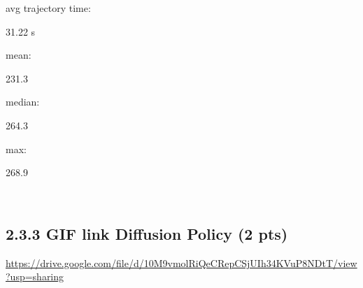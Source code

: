 \documentclass[12pt]{article}
\begin{document}
avg trajectory time: \begin{tcolorbox}[fit,height=1cm, width=2cm, blank, borderline={1pt}{1pt},nobeforeafter]
    \begin{center}
    \vspace{3mm}
    \large{31.22 s}
    \end{center}
\end{tcolorbox}
mean: \begin{tcolorbox}[fit,height=1cm, width=2cm, blank, borderline={1pt}{1pt},nobeforeafter]
    \begin{center}
    \vspace{3mm}
    \large{231.3}
    \end{center}
\end{tcolorbox}
median: \begin{tcolorbox}[fit,height=1cm, width=2cm, blank, borderline={1pt}{1pt},nobeforeafter]
    \begin{center}
    \vspace{3mm}
    \large{264.3}
    \end{center}
\end{tcolorbox}
max: \begin{tcolorbox}[fit,height=1cm, width=2cm, blank, borderline={1pt}{1pt},nobeforeafter]
    \begin{center}
    \vspace{3mm}
    \large{268.9}
    \end{center}
\end{tcolorbox}
    \\

\subsection*{2.3.3 GIF link Diffusion Policy (2 pts)}

\begin{tcolorbox}[fit,height=5em, width=40em, blank, borderline={1pt}{1pt},nobeforeafter]
            \begin{solution}
            \url{https://drive.google.com/file/d/10M9vmolRiQeCRepCSjUIh34KVuP8NDtT/view?usp=sharing}
            \end{solution}

\end{tcolorbox}
    
\end{document}
